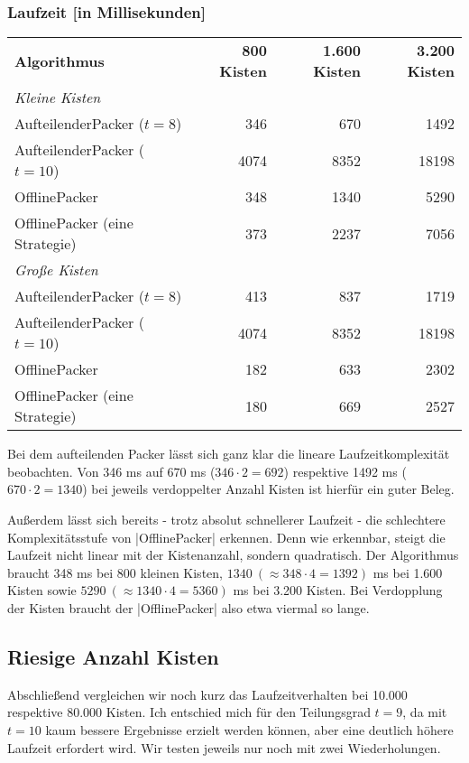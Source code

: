 \subsubsection*{Laufzeit [in Millisekunden]}
\begin{center}
\begin{tabular}{lrrr}
\vspace*{.42em}
\textbf{Algorithmus} 	& \textbf{800 Kisten} 	& \textbf{1.600 Kisten} & \textbf{3.200 Kisten} \\
\textit{Kleine Kisten} & & & \\
 AufteilenderPacker ($t=8$)	& 346		& 670			& 1492			\\
 AufteilenderPacker ($t=10$)  	& 4074		& 8352			& 18198			\\
 OfflinePacker			& 348		& 1340			& 5290			\\
 OfflinePacker (eine Strategie)	& 373		& 2237			& 7056			\\
\vspace*{.42em}
\textit{Große Kisten} & & & \\
 AufteilenderPacker ($t=8$)  	& 413		& 837			& 1719			\\
 AufteilenderPacker ($t=10$)  	& 4074		& 8352			& 18198			\\
 OfflinePacker			& 182		& 633			& 2302			\\
 OfflinePacker (eine Strategie)	& 180		& 669			& 2527			\\
\end{tabular}
\end{center}
 Bei dem aufteilenden Packer lässt sich ganz klar die lineare Laufzeitkomplexität beobachten.
 Von 346 ms auf 670 ms ($346 \cdot 2 = 692$) respektive 1492 ms ($670 \cdot 2 = 1340$) bei jeweils verdoppelter Anzahl Kisten ist hierfür ein guter Beleg.

 Außerdem lässt sich bereits - trotz absolut schnellerer Laufzeit - die schlechtere Komplexitätsstufe von |OfflinePacker| erkennen.
 Denn wie erkennbar, steigt die Laufzeit nicht linear mit der Kistenanzahl, sondern quadratisch.
 Der Algorithmus braucht 348 ms bei 800 kleinen Kisten, $1340\ (\approx 348 \cdot 4 = 1392)$ ms bei 1.600 Kisten sowie $5290\ (\approx 1340 \cdot 4 = 5360)$ ms bei 3.200 Kisten.
 Bei Verdopplung der Kisten braucht der |OfflinePacker| also etwa viermal so lange.

\subsection{Riesige Anzahl Kisten}
 Abschließend vergleichen wir noch kurz das Laufzeitverhalten bei 10.000 respektive 80.000 Kisten.
 Ich entschied mich für den Teilungsgrad $t=9$, da mit $t=10$ kaum bessere Ergebnisse erzielt werden können, aber eine deutlich höhere Laufzeit erfordert wird.
 Wir testen jeweils nur noch mit zwei Wiederholungen.

